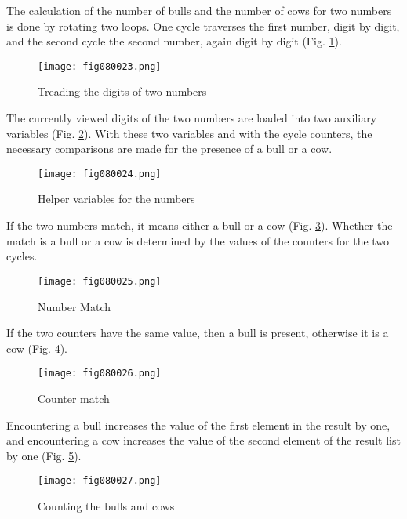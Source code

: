 The calculation of the number of bulls and the number of cows for two numbers is done by rotating two loops. One cycle traverses the first number, digit by digit, and the second cycle the second number, again digit by digit (Fig. \ref{fig080023}).

\begin{figure}[H]
   \centering
   \texttt{[image: fig080023.png]}
   \caption{Treading the digits of two numbers}
\label{fig080023}
\end{figure}

The currently viewed digits of the two numbers are loaded into two auxiliary variables (Fig. \ref{fig080024}). With these two variables and with the cycle counters, the necessary comparisons are made for the presence of a bull or a cow.

\begin{figure}[H]
   \centering
   \texttt{[image: fig080024.png]}
   \caption{Helper variables for the numbers}
\label{fig080024}
\end{figure}

If the two numbers match, it means either a bull or a cow (Fig. \ref{fig080025}). Whether the match is a bull or a cow is determined by the values of the counters for the two cycles.

\begin{figure}[H]
   \centering
   \texttt{[image: fig080025.png]}
   \caption{Number Match}
\label{fig080025}
\end{figure}

If the two counters have the same value, then a bull is present, otherwise it is a cow (Fig. \ref{fig080026}).

\begin{figure}[H]
   \centering
   \texttt{[image: fig080026.png]}
   \caption{Counter match}
\label{fig080026}
\end{figure}

Encountering a bull increases the value of the first element in the result by one, and encountering a cow increases the value of the second element of the result list by one (Fig. \ref{fig080027}).

\begin{figure}[H]
   \centering
   \texttt{[image: fig080027.png]}
   \caption{Counting the bulls and cows}
\label{fig080027}
\end{figure}

